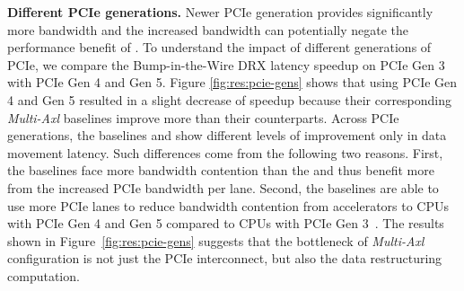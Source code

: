 \noindent \textbf{Different PCIe generations.}
Newer PCIe generation provides significantly more bandwidth and the increased bandwidth can potentially negate the performance benefit of \dmx. 
%
To understand the impact of different generations of PCIe, we compare the Bump-in-the-Wire DRX latency speedup on PCIe Gen 3 with PCIe Gen 4 and Gen 5.
%
Figure \ref{fig:res:pcie-gens} shows that using PCIe Gen 4 and Gen 5 resulted in a slight decrease of speedup because their corresponding \emph{Multi-Axl} baselines improve more than their \dmx counterparts.
%
Across PCIe generations, the baselines and \dmx show different levels of improvement only in data movement latency. 
%
Such differences come from the following two reasons.
%
First, the baselines face more bandwidth contention than the \dmx and thus benefit more from the increased PCIe bandwidth per lane.
%
Second, the baselines are able to use more PCIe lanes to reduce bandwidth contention from accelerators to CPUs with PCIe Gen 4 and Gen 5 compared to CPUs with PCIe Gen 3~\cite{intel-cascade-lake, intel-ice-lake, intel-sapphire-rapids}. The results shown in Figure~\ref{fig:res:pcie-gens} suggests that the bottleneck of \emph{Multi-Axl} configuration is not just the PCIe interconnect, but also the data restructuring computation. 

